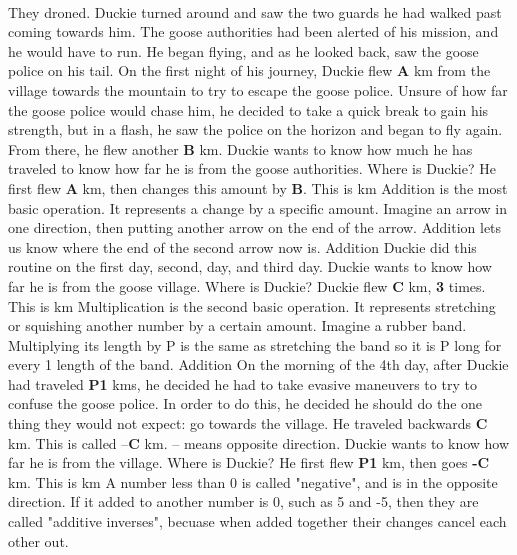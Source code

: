 \documentclass[a4paper,11pt ]{book}
\begin{document}
\paragraph{} They droned. Duckie turned around and saw the two guards he had walked past coming towards him. The goose authorities had been alerted of his mission, and he would have to run. He began flying, and as he looked back, saw the goose police on his tail. 
\vfill
\pagebreak
{On the first night of his journey, Duckie flew \textbf{A} km from the village towards the mountain to try to escape the goose police. Unsure of how far the goose police would chase him, he decided to take a quick break to gain his strength, but in a flash, he saw the police on the horizon and began to fly again. From there, he flew another \textbf{B} km. Duckie wants to know how much he has traveled to know how far he is from the goose authorities. Where is Duckie?}
{He first flew \textbf{A} km, then changes this amount by \textbf{B}. This is  km}
{Addition is the most basic operation. It represents a change by a specific amount. Imagine an arrow in one direction, then putting another arrow on the end of the arrow. Addition lets us know where the end of the second arrow now is.}
{Addition}
{Duckie did this routine on the first day, second, day, and third day.  Duckie wants to know how far he is from the goose village. Where is Duckie?}
{Duckie flew \textbf{C} km, \textbf{3} times. This is  km}
{Multiplication is the second basic operation. It represents stretching or squishing another number by a certain amount. Imagine a rubber band. Multiplying its length by P is the same as stretching the band so it is P long for every 1 length of the band.}
{Addition}
{On the morning of the 4th day, after Duckie had traveled \textbf{P1} kms, he decided he had to take evasive maneuvers to try to confuse the goose police. In order to do this, he decided he should do the one thing they would not expect: go towards the village. He traveled backwards \textbf{C} km. This is called –\textbf{C} km. \linebreak – means opposite direction. Duckie wants to know how far he is from the village. Where is Duckie?}
{He first flew \textbf{P1} km, then goes \textbf{-C} km. This is  km}
{A number less than 0 is called "negative", and is in the opposite direction. If it added to another number is 0, such as 5 and -5, then they are called "additive inverses", becuase when added together their changes cancel each other out.}
\end{document}
